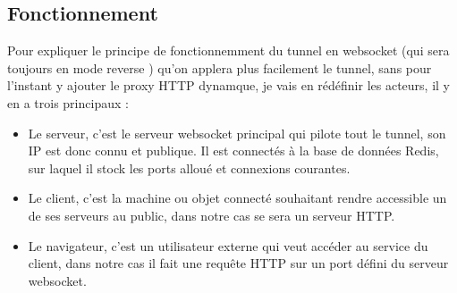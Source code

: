 \subsection{Fonctionnement}

Pour expliquer le principe de fonctionnemment du tunnel en websocket (qui sera toujours en mode \og reverse \fg{}) qu'on applera plus facilement le tunnel, sans pour l'instant y ajouter le proxy HTTP dynamque, je vais en rédéfinir les acteurs, il y en a trois principaux :
\begin{itemize}
    \item Le serveur, c'est le serveur websocket principal qui pilote tout le tunnel, son IP est donc connu et publique. Il est connectés à la base de données Redis, sur laquel il stock les ports alloué et connexions courantes.
    \item Le client, c'est la machine ou objet connecté souhaitant rendre accessible un de ses serveurs au public, dans notre cas se sera un serveur HTTP.
    \item Le navigateur, c'est un utilisateur externe qui veut accéder au service du client, dans notre cas il fait une requête HTTP sur un port défini du serveur websocket. 
\end{itemize}

